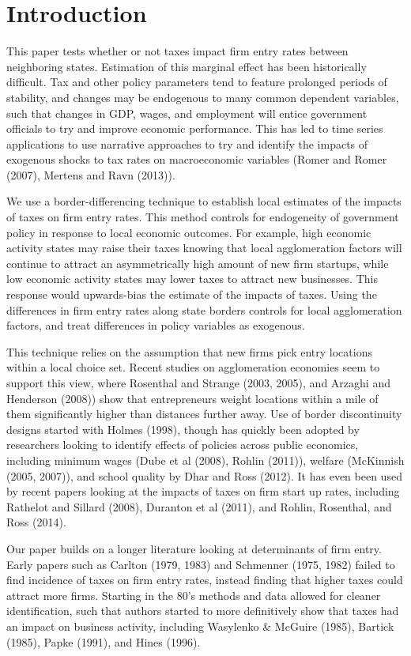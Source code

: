 
\section{Introduction} 

This paper tests whether or not taxes impact firm entry rates between neighboring states. Estimation of this marginal effect has been historically difficult. Tax and other policy parameters tend to feature prolonged periods of stability, and changes may be endogenous to many common dependent variables, such that changes in GDP, wages, and employment will entice government officials to try and improve economic performance. This has led to time series applications to use narrative approaches to try and identify the impacts of exogenous shocks to tax rates on macroeconomic variables (Romer and Romer (2007), Mertens and Ravn (2013)). 

We use a border-differencing technique to establish local estimates of the impacts of taxes on firm entry rates. This method controls for endogeneity of government policy in response to local economic outcomes. For example, high economic activity states may raise their taxes knowing that local agglomeration factors will continue to attract an asymmetrically high amount of new firm startups, while low economic activity states may lower taxes to attract new businesses. This response would upwards-bias the estimate of the impacts of taxes. Using the differences in firm entry rates along state borders controls for local agglomeration factors, and treat differences in policy variables as exogenous.

This technique relies on the assumption that new firms pick entry locations within a local choice set. Recent studies on agglomeration economies seem to support this view, where Rosenthal and Strange (2003, 2005), and Arzaghi and Henderson (2008)) show that entrepreneurs weight locations within a mile of them significantly higher than distances further away. Use of border discontinuity designs started with Holmes (1998), though has quickly been adopted by researchers looking to identify effects of policies across public economics, including minimum wages (Dube et al (2008), Rohlin (2011)), welfare (McKinnish (2005, 2007)), and school quality by Dhar and Ross (2012). It has even been used by recent papers looking at the impacts of taxes on firm start up rates, including Rathelot and Sillard (2008), Duranton et al (2011), and Rohlin, Rosenthal, and Ross (2014).

Our paper builds on a longer literature looking at determinants of firm entry. Early papers such as Carlton (1979, 1983) and Schmenner (1975, 1982) failed to find incidence of taxes on firm entry rates, instead finding that higher taxes could attract more firms. Starting in the 80's methods and data  allowed for cleaner identification, such that authors started to more definitively show that taxes had an impact on business activity, including Wasylenko \& McGuire (1985), Bartick (1985), Papke (1991), and Hines (1996).

